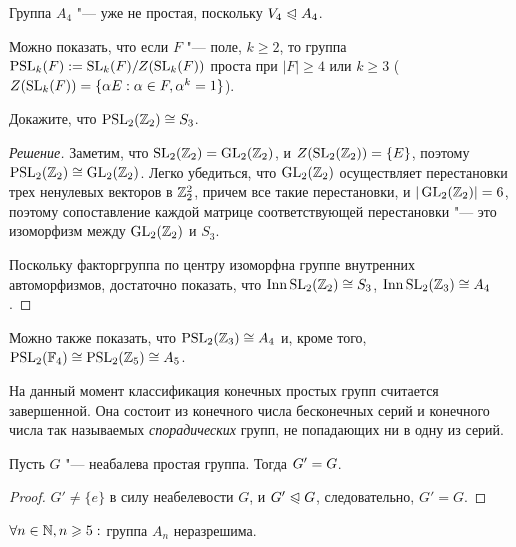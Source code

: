 \begin{note}
	Группа $A_4$ "--- уже не простая, поскольку $V_4 \trianglelefteqslant A_4$.
\end{note}

\begin{note}
	Можно показать, что если $F$ "--- поле, $k \ge 2$, то группа $\PSL_k(F) \hm{:=} \SL_k(F) / Z(\SL_k(F))$ проста при $|F| \ge 4$ или $k \ge 3$ ($Z(\operatorname{SL}_k(F)) = \{\alpha E: \alpha \in F, \alpha^k = 1\}$).
\end{note}

\begin{exercise}
	Докажите, что $\operatorname{PSL}_2(\mathbb{Z}_2) \cong S_3$.
\end{exercise}

\begin{proof}[Решение]
	Заметим, что $\operatorname{SL}_2(\mathbb{Z}_2)  = \operatorname{GL}_2(\mathbb{Z}_2)$, и $Z(\operatorname{SL}_2(\mathbb{Z}_2)) = \{E\}$, поэтому $\PSL_2(\Z_2) \hm\cong \GL_2(\Z_2)$. Легко убедиться, что $\operatorname{GL}_2(\mathbb{Z}_2)$ осуществляет перестановки трех ненулевых векторов в $\mathbb{Z}_2^2$, причем все такие перестановки, и $|\operatorname{GL}_2(\mathbb{Z}_2)| = 6$, поэтому сопоставление каждой матрице соответствующей перестановки "--- это изоморфизм между $\operatorname{GL}_2(\mathbb{Z}_2)$ и $S_3$.
	
	Поскольку факторгруппа по центру изоморфна группе внутренних автоморфизмов, достаточно показать, что $\Inn{\SL_2(\Z_2)} \hm\cong S_3$, $\operatorname{Inn}{\operatorname{SL}_2(\mathbb{Z}_3)} \cong A_4$.
\end{proof}

\begin{note}
	Можно также показать, что $\operatorname{PSL}_2(\mathbb{Z}_3) \cong A_4$ и, кроме того, $\PSL_2(\mathbb{F}_4) \hm\cong \PSL_2(\Z_5) \cong A_5$.
\end{note}

\begin{note}
	На данный момент классификация конечных простых групп считается завершенной. Она состоит из конечного числа бесконечных серий и конечного числа так называемых \textit{спорадических} групп, не попадающих ни в одну из серий.
\end{note}

\begin{proposition}
	Пусть $G$ "--- неабалева простая группа. Тогда $G' \hm= G$.
\end{proposition}

\begin{proof}
	$G' \ne \{e\}$ в силу неабелевости $G$, и $G' \trianglelefteqslant G$, следовательно, $G' = G$.
\end{proof}

\begin{corollary}
	$\forall n \in \mathbb{N}, n \geqslant 5:$ группа $A_n$ неразрешима.
\end{corollary}

